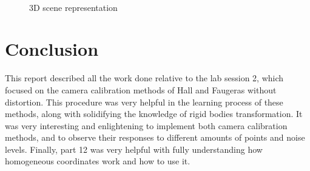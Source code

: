 \documentclass[journal]{IEEEtran}
\begin{document}
\begin{figure}[p]
	\centering

	\\
	\caption{3D scene representation}
	\label{fig:scene}
\end{figure}





\section{Conclusion}\label{conclusion}

This report described all the work done relative to the lab session 2, which focused on the camera calibration methods of Hall and Faugeras without distortion. This procedure was very helpful in the learning process of these methods, along with solidifying the knowledge of rigid bodies transformation. It was very interesting and enlightening to implement both camera calibration methods, and to observe their responses to different amounts of points and noise levels. Finally, part 12 was very helpful with fully understanding how homogeneous coordinates work and how to use it.
\end{document}
